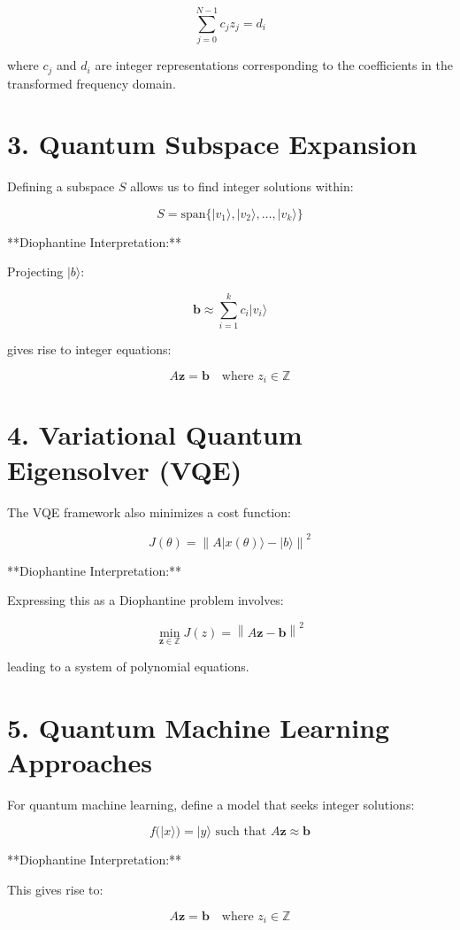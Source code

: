 \documentclass{article}
\begin{document}
\[
\sum_{j=0}^{N-1} c_j z_j = d_i
\]

where \( c_j \) and \( d_i \) are integer representations corresponding to the coefficients in the transformed frequency domain.

\section{3. Quantum Subspace Expansion}

Defining a subspace \( S \) allows us to find integer solutions within:

\[
S = \text{span}\{|v_1\rangle, |v_2\rangle, \ldots, |v_k\rangle\}
\]

**Diophantine Interpretation:**

Projecting \( |b\rangle \):

\[
\mathbf{b} \approx \sum_{i=1}^{k} c_i |v_i\rangle
\]

gives rise to integer equations:

\[
A \mathbf{z} = \mathbf{b} \quad \text{where } z_i \in \mathbb{Z}
\]

\section{4. Variational Quantum Eigensolver (VQE)}

The VQE framework also minimizes a cost function:

\[
J(\theta) = \left\| A |x(\theta)\rangle - |b\rangle \right\|^2
\]

**Diophantine Interpretation:**

Expressing this as a Diophantine problem involves:

\[
\min_{\mathbf{z} \in \mathbb{Z}} J(z) = \left\| A \mathbf{z} - \mathbf{b} \right\|^2
\]

leading to a system of polynomial equations.

\section{5. Quantum Machine Learning Approaches}

For quantum machine learning, define a model that seeks integer solutions:

\[
f(|x\rangle) = |y\rangle \text{ such that } A \mathbf{z} \approx \mathbf{b}
\]

**Diophantine Interpretation:**

This gives rise to:

\[
A \mathbf{z} = \mathbf{b} \quad \text{where } z_i \in \mathbb{Z}
\]
\end{document}
